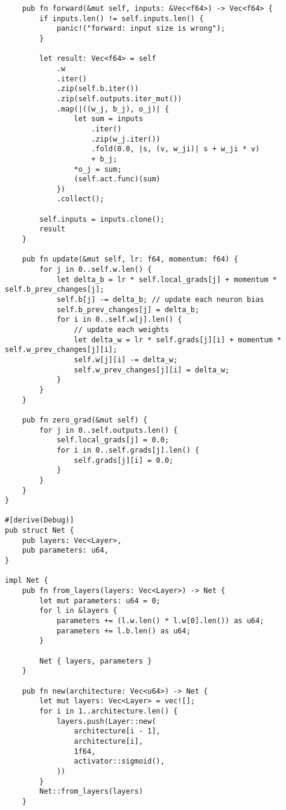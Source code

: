 \begin{code}
\begin{verbatim}
    pub fn forward(&mut self, inputs: &Vec<f64>) -> Vec<f64> {
        if inputs.len() != self.inputs.len() {
            panic!("forward: input size is wrong");
        }

        let result: Vec<f64> = self
            .w
            .iter()
            .zip(self.b.iter())
            .zip(self.outputs.iter_mut())
            .map(|((w_j, b_j), o_j)| {
                let sum = inputs
                    .iter()
                    .zip(w_j.iter())
                    .fold(0.0, |s, (v, w_ji)| s + w_ji * v)
                    + b_j;
                *o_j = sum;
                (self.act.func)(sum)
            })
            .collect();

        self.inputs = inputs.clone();
        result
    }

    pub fn update(&mut self, lr: f64, momentum: f64) {
        for j in 0..self.w.len() {
            let delta_b = lr * self.local_grads[j] + momentum * self.b_prev_changes[j];
            self.b[j] -= delta_b; // update each neuron bias
            self.b_prev_changes[j] = delta_b;
            for i in 0..self.w[j].len() {
                // update each weights
                let delta_w = lr * self.grads[j][i] + momentum * self.w_prev_changes[j][i];
                self.w[j][i] -= delta_w;
                self.w_prev_changes[j][i] = delta_w;
            }
        }
    }

    pub fn zero_grad(&mut self) {
        for j in 0..self.outputs.len() {
            self.local_grads[j] = 0.0;
            for i in 0..self.grads[j].len() {
                self.grads[j][i] = 0.0;
            }
        }
    }
}

#[derive(Debug)]
pub struct Net {
    pub layers: Vec<Layer>,
    pub parameters: u64,
}

impl Net {
    pub fn from_layers(layers: Vec<Layer>) -> Net {
        let mut parameters: u64 = 0;
        for l in &layers {
            parameters += (l.w.len() * l.w[0].len()) as u64;
            parameters += l.b.len() as u64;
        }

        Net { layers, parameters }
    }

    pub fn new(architecture: Vec<u64>) -> Net {
        let mut layers: Vec<Layer> = vec![];
        for i in 1..architecture.len() {
            layers.push(Layer::new(
                architecture[i - 1],
                architecture[i],
                1f64,
                activator::sigmoid(),
            ))
        }
        Net::from_layers(layers)
    }


\end{verbatim}
\end{code}
